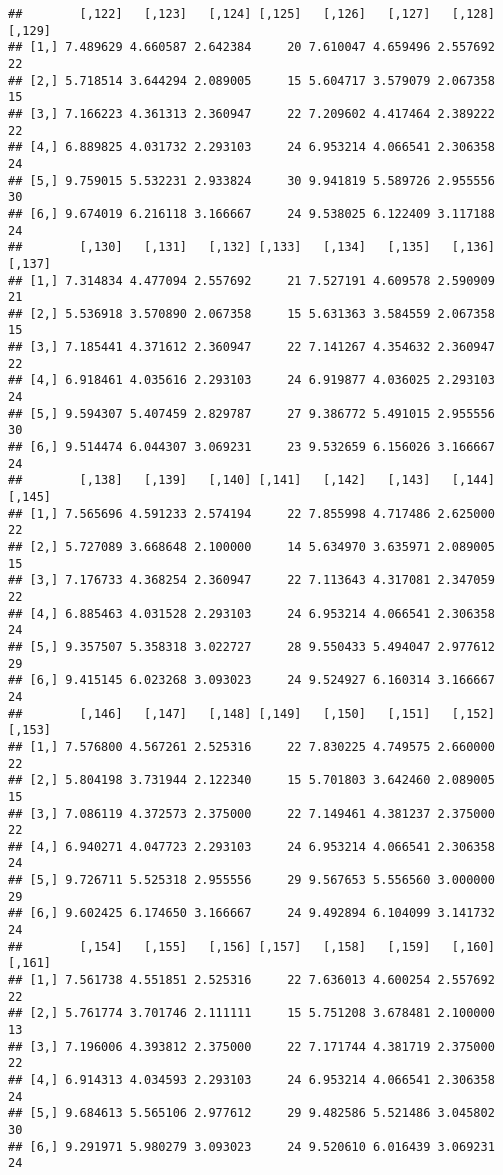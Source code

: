 \documentclass[]{article}
\begin{document}
\begin{verbatim}
##        [,122]   [,123]   [,124] [,125]   [,126]   [,127]   [,128] [,129]
## [1,] 7.489629 4.660587 2.642384     20 7.610047 4.659496 2.557692     22
## [2,] 5.718514 3.644294 2.089005     15 5.604717 3.579079 2.067358     15
## [3,] 7.166223 4.361313 2.360947     22 7.209602 4.417464 2.389222     22
## [4,] 6.889825 4.031732 2.293103     24 6.953214 4.066541 2.306358     24
## [5,] 9.759015 5.532231 2.933824     30 9.941819 5.589726 2.955556     30
## [6,] 9.674019 6.216118 3.166667     24 9.538025 6.122409 3.117188     24
##        [,130]   [,131]   [,132] [,133]   [,134]   [,135]   [,136] [,137]
## [1,] 7.314834 4.477094 2.557692     21 7.527191 4.609578 2.590909     21
## [2,] 5.536918 3.570890 2.067358     15 5.631363 3.584559 2.067358     15
## [3,] 7.185441 4.371612 2.360947     22 7.141267 4.354632 2.360947     22
## [4,] 6.918461 4.035616 2.293103     24 6.919877 4.036025 2.293103     24
## [5,] 9.594307 5.407459 2.829787     27 9.386772 5.491015 2.955556     30
## [6,] 9.514474 6.044307 3.069231     23 9.532659 6.156026 3.166667     24
##        [,138]   [,139]   [,140] [,141]   [,142]   [,143]   [,144] [,145]
## [1,] 7.565696 4.591233 2.574194     22 7.855998 4.717486 2.625000     22
## [2,] 5.727089 3.668648 2.100000     14 5.634970 3.635971 2.089005     15
## [3,] 7.176733 4.368254 2.360947     22 7.113643 4.317081 2.347059     22
## [4,] 6.885463 4.031528 2.293103     24 6.953214 4.066541 2.306358     24
## [5,] 9.357507 5.358318 3.022727     28 9.550433 5.494047 2.977612     29
## [6,] 9.415145 6.023268 3.093023     24 9.524927 6.160314 3.166667     24
##        [,146]   [,147]   [,148] [,149]   [,150]   [,151]   [,152] [,153]
## [1,] 7.576800 4.567261 2.525316     22 7.830225 4.749575 2.660000     22
## [2,] 5.804198 3.731944 2.122340     15 5.701803 3.642460 2.089005     15
## [3,] 7.086119 4.372573 2.375000     22 7.149461 4.381237 2.375000     22
## [4,] 6.940271 4.047723 2.293103     24 6.953214 4.066541 2.306358     24
## [5,] 9.726711 5.525318 2.955556     29 9.567653 5.556560 3.000000     29
## [6,] 9.602425 6.174650 3.166667     24 9.492894 6.104099 3.141732     24
##        [,154]   [,155]   [,156] [,157]   [,158]   [,159]   [,160] [,161]
## [1,] 7.561738 4.551851 2.525316     22 7.636013 4.600254 2.557692     22
## [2,] 5.761774 3.701746 2.111111     15 5.751208 3.678481 2.100000     13
## [3,] 7.196006 4.393812 2.375000     22 7.171744 4.381719 2.375000     22
## [4,] 6.914313 4.034593 2.293103     24 6.953214 4.066541 2.306358     24
## [5,] 9.684613 5.565106 2.977612     29 9.482586 5.521486 3.045802     30
## [6,] 9.291971 5.980279 3.093023     24 9.520610 6.016439 3.069231     24

\end{verbatim}
\end{document}
